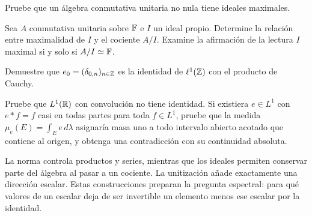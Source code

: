 \begin{ejercicio}\label{ej:v3-l20-2}
Pruebe que un álgebra conmutativa unitaria no nula tiene ideales maximales.
\end{ejercicio}


\begin{ejercicio}\label{ej:v3-l20-3}
Sea $A$ conmutativa unitaria sobre $\mathbb F$ e $I$ un ideal propio. Determine la relación entre maximalidad de $I$ y el cociente $A/I$. Examine la afirmación de la lectura $I$ maximal si y solo si $A/I\simeq\mathbb F$.
\end{ejercicio}


\begin{ejercicio}\label{ej:v3-l20-4}
Demuestre que $e_0=(\delta_{0,n})_{n\in\mathbb Z}$ es la identidad de $\ell^1(\mathbb Z)$ con el producto de Cauchy.
\end{ejercicio}


\begin{ejercicio}\label{ej:v3-l20-5}
Pruebe que $L^1(\mathbb R)$ con convolución no tiene identidad. Si existiera $e\in L^1$ con $e*f=f$ casi en todas partes para toda $f\in L^1$, pruebe que la medida $\mu_e(E)=\int_E e\,d\lambda$ asignaría masa uno a todo intervalo abierto acotado que contiene al origen, y obtenga una contradicción con su continuidad absoluta.
\end{ejercicio}


La norma controla productos y series, mientras que los ideales permiten conservar parte del álgebra al pasar a un cociente. La unitización añade exactamente una dirección escalar. Estas construcciones preparan la pregunta espectral: para qué valores de un escalar deja de ser invertible un elemento menos ese escalar por la identidad.
